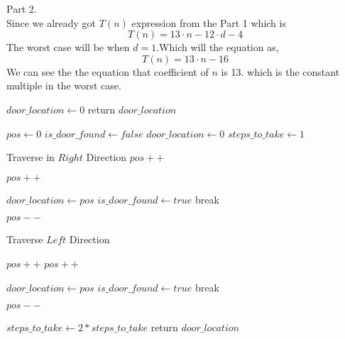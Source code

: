\documentclass[a4paper,11pt]{article}
\theoremstyle{quest}
\newenvironment{solution}[2][Solution]{\begin{trivlist}
		\item[\hskip \labelsep {\bfseries #1}\hskip \labelsep {\bfseries #2.}]}{\end{trivlist}}
\begin{document}
\begin{solution}
	\textbf{Part 2.}\\
	
	Since we already got $T(n)$ expression from the Part 1 which is 
		\begin{equation*}
		T(n) = 13 \cdot n - 12\cdot d - 4
		\end{equation*}
	The worst case will be when $d = 1$.Which will the equation as,
	\begin{equation*}
	T(n) = 13 \cdot n - 16
	\end{equation*}
	 We can see the the equation that coefficient of $n$ is 13. which is the constant multiple in the worst case.
	\begin{algorithm}
		\begin{algorithmic}[h]
			
			 
			\State $door\_location \gets 0$
			\State return $door\_location$
			\EndIf
			
			\State $pos \gets 0$ 
			\State $is\_door\_found \gets false$ 
			\State $door\_location \gets 0$
			\State $steps\_to\_take \gets 1$ 
			
			\State Traverse in $Right$ Direction
			  
			\State $pos++ $ 
			\EndWhile
			
			 
			\State $pos++$
			
			 
			\State $door\_location \gets pos$
			\State $is\_door\_found \gets true$
			\State break
			\EndIf
			 
			\EndWhile
			
			 
			  
			\State $pos-- $ 
			\EndWhile
			
			\State Traverse $Left$ Direction
			
			  
			\State $pos++ $ 
			\EndWhile
			 
			\State $pos++$
			
			 
			\State $door\_location \gets pos$
			\State $is\_door\_found \gets true$
			\State break
			\EndIf
			
			\EndWhile
			\EndIf
			 
			  
			\State $pos-- $ 
			\EndWhile
			
			\State $steps\_to\_take \gets 2*steps\_to\_take$ 
			\EndIf
			\EndWhile
			\State return $door\_location$
			\EndProcedure
		\end{algorithmic}
	\end{algorithm}

\end{solution} 
\end{document}
